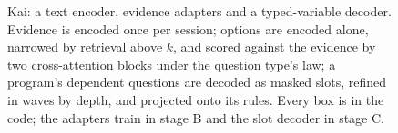 \begin{figure}[t]
\caption{Kai: a text encoder, evidence adapters and a typed-variable decoder.
Evidence is encoded once per session; options are encoded alone, narrowed by
retrieval above $k$, and scored against the evidence by two cross-attention
blocks under the question type's law; a program's dependent questions are
decoded as masked slots, refined in waves by depth, and projected onto its
rules. Every box is in the code; the adapters train in stage B and the slot
decoder in stage C.}
\label{fig:kai}
\end{figure}

